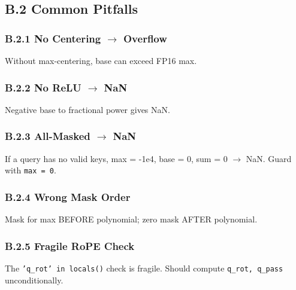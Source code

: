 \subsection{B.2 Common Pitfalls}

\subsubsection{B.2.1 No Centering $\to$ Overflow}

Without max-centering, base can exceed FP16 max.

\subsubsection{B.2.2 No ReLU $\to$ NaN}

Negative base to fractional power gives NaN.

\subsubsection{B.2.3 All-Masked $\to$ NaN}

If a query has no valid keys, max = -1e4, base = 0, sum = 0 $\to$ NaN. 
Guard with \texttt{max = 0}.

\subsubsection{B.2.4 Wrong Mask Order}

Mask for max BEFORE polynomial; zero mask AFTER polynomial.

\subsubsection{B.2.5 Fragile RoPE Check}

The \texttt{'q\_rot' in locals()} check is fragile. Should compute \texttt{q\_rot, q\_pass} 
unconditionally.

